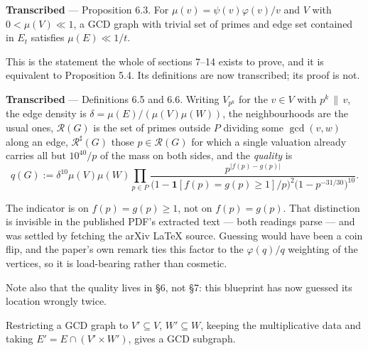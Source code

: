 \begin{theorem}
  \label{thm:edge-bound}
  \notready
  \textbf{Transcribed} --- Proposition 6.3. For $\mu(v) = \psi(v)\varphi(v)/v$ and
  $V$ with $0 < \mu(V) \ll 1$, a GCD graph with trivial set of primes and edge set
  contained in $E_t$ satisfies $\mu(E) \ll 1/t$.

  This is the statement the whole of sections 7--14 exists to prove, and it is equivalent
  to Proposition 5.4. Its definitions are now transcribed; its proof is not.
\end{theorem}

\begin{definition}
  \label{def:quality}
  \leanok
  \textbf{Transcribed} --- Definitions 6.5 and 6.6. Writing $V_{p^k}$ for the $v \in V$
  with $p^k \,\|\, v$, the edge density is $\delta = \mu(E)/(\mu(V)\mu(W))$, the
  neighbourhoods are the usual ones, $\mathcal{R}(G)$ is the set of primes outside $P$ dividing
  some $\gcd(v,w)$ along an edge, $\mathcal{R}^{\sharp}(G)$ those $p \in \mathcal{R}(G)$ for which a single
  valuation already carries all but $10^{40}/p$ of the mass on both sides, and the
  \emph{quality} is
  \[ q(G) := \delta^{10}\mu(V)\mu(W)
     \prod_{p \in P}
     \frac{p^{|f(p)-g(p)|}}
          {\bigl(1 - \mathbf{1}[f(p)=g(p)\geq 1]/p\bigr)^2
           \bigl(1 - p^{-31/30}\bigr)^{10}} . \]
\end{definition}

\begin{remark}
  The indicator is on $f(p) = g(p) \geq 1$, not on $f(p) = g(p)$. That distinction is
  invisible in the published PDF's extracted text --- both readings parse --- and was
  settled by fetching the arXiv \LaTeX{} source. Guessing would have been a coin flip, and
  the paper's own remark ties this factor to the $\varphi(q)/q$ weighting of the vertices,
  so it is load-bearing rather than cosmetic.

  Note also that the quality lives in \S6, not \S7: this blueprint has now guessed its
  location wrongly twice.
\end{remark}

\begin{lemma}
  \label{lem:induced}
  \leanok
  Restricting a GCD graph to $V' \subseteq V$, $W' \subseteq W$, keeping the
  multiplicative data and taking $E' = E \cap (V' \times W')$, gives a GCD subgraph.
\end{lemma}

